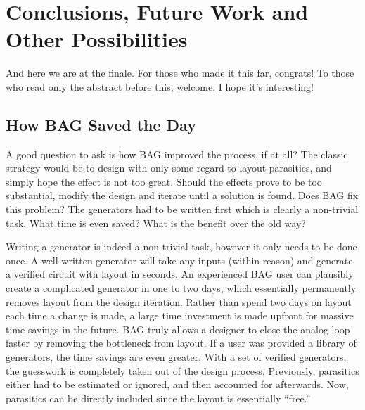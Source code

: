 \chapter{Conclusions, Future Work and Other Possibilities}
And here we are at the finale. For those who made it this far, congrats! To those who read only the abstract before this, welcome. I hope it's interesting!
\section{How BAG Saved the Day}
A good question to ask is how BAG improved the process, if at all? The classic strategy would be to design with only some regard to layout parasitics, and simply hope the effect is not too great. Should the effects prove to be too substantial, modify the design and iterate until a solution is found. Does BAG fix this problem? The generators had to be written first which is clearly a non-trivial task. What time is even saved? What is the benefit over the old way? 

Writing a generator is indeed a non-trivial task, however it only needs to be done once. A well-written generator will take any inputs (within reason) and generate a verified circuit with layout in seconds. An experienced BAG user can plausibly create a complicated generator in one to two days, which essentially permanently removes layout from the design iteration. Rather than spend two days on layout each time a change is made, a large time investment is made upfront for massive time savings in the future. BAG truly allows a designer to close the analog loop faster by removing the bottleneck from layout. If a user was provided a library of generators, the time savings are even greater. With a set of verified generators, the guesswork is completely taken out of the design process. Previously, parasitics either had to be estimated or ignored, and then accounted for afterwards. Now, parasitics can be directly included since the layout is essentially ``free.'' 

